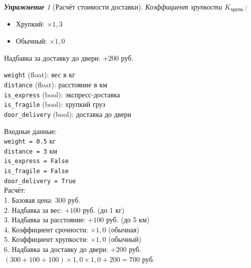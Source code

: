 \documentclass[a4paper,12pt]{article}
\theoremstyle{remark}
\newtheorem{exercise}{\textbf{Упражнение}}[section]
\begin{document}
\begin{exercise}[Расчёт стоимости доставки]
\textit{Коэффициент хрупкости $K_{\text{хрупк.}}$:}
\begin{itemize}
    \item Хрупкий: $\times 1{,}3$
    \item Обычный: $\times 1{,}0$
\end{itemize}

Надбавка за доставку до двери: $+200$ руб.

\begin{inputformat}[title=Входные данные]
    \texttt{weight} (float): вес в кг \\
    \texttt{distance} (float): расстояние в км \\
    \texttt{is\_express} (bool): экспресс-доставка \\
    \texttt{is\_fragile} (bool): хрупкий груз \\
    \texttt{door\_delivery} (bool): доставка до двери
\end{inputformat}

\begin{outputformat}[title=Пример 1]
    Входные данные: \\
    \texttt{weight = 0.5} кг \\
    \texttt{distance = 3} км \\
    \texttt{is\_express = False} \\
    \texttt{is\_fragile = False} \\
    \texttt{door\_delivery = True} \\[4pt]
    Расчёт: \\
    1. Базовая цена: 300 руб. \\
    2. Надбавка за вес: $+100$ руб. (до 1 кг) \\
    3. Надбавка за расстояние: $+100$ руб. (до 5 км) \\
    4. Коэффициент срочности: $\times 1{,}0$ (обычная) \\
    5. Коэффициент хрупкости: $\times 1{,}0$ (обычный) \\
    6. Надбавка за доставку до двери: $+200$ руб. \\[4pt]
    $(300 + 100 + 100) \times 1{,}0 \times 1{,}0 + 200 = 700$ руб.
\end{outputformat}


\end{exercise}
\end{document}
